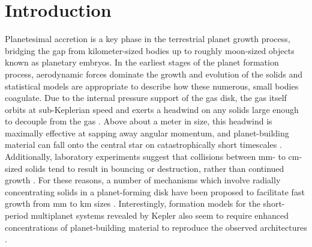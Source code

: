 \documentclass[twocolumn]{aastex63}
\begin{document}

\section{Introduction} \label{sec:intro}

Planetesimal accretion is a key phase in the terrestrial planet growth
process, bridging the gap from kilometer-sized bodies up to roughly
moon-sized objects known as planetary embryos. In the earliest stages
of the planet formation process, aerodynamic forces dominate the
growth and evolution of the solids and statistical models
\citep{johansen14, birnstiel16} are appropriate to describe how these
numerous, small bodies coagulate. Due to the internal pressure support
of the gas disk, the gas itself orbits at sub-Keplerian speed and
exerts a headwind on any solids large enough to decouple from the gas
\citep{weidenschilling77}. Above about a meter in size, this headwind
is maximally effective at sapping away angular momentum, and planet-building material can fall onto the central star on catastrophically short timescales \citep{weidenschilling77, nakagawa86}. Additionally, laboratory experiments suggest that collisions between mm- to cm- sized solids tend to result in bouncing or destruction, rather than continued growth \citep{blum93, beitz11, colwell03}. For these reasons, a number of mechanisms which involve radially concentrating solids in a planet-forming disk have been proposed to facilitate fast growth from mm to km sizes \citep{johansen07, lyra08, bai10}. Interestingly, formation models for the short-period multiplanet systems revealed by Kepler \citep{fabrycky14} also seem to require enhanced concentrations of planet-building material to reproduce the observed architectures \citep{raymond07, hansen12}.
\end{document}
